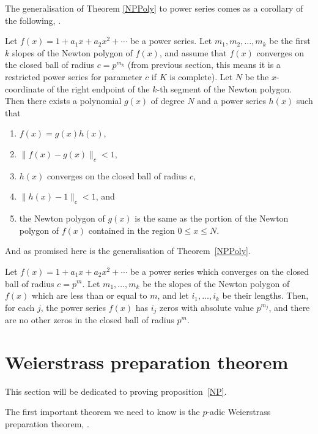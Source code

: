 The generalisation of Theorem \ref{NPPoly} to power series comes as a corollary of the following,
\cite[proposition~7.4.10]{Gouvea}.

\begin{proposition}\label{NP}
    Let $f(x) = 1 + a_1 x + a_2 x^2 + \cdots$ be a power series. Let $m_1,m_2, \dots,m_k$ be the
    first $k$ slopes of the Newton polygon of $f(x)$, and assume that $f(x)$ converges on the
    closed ball of radius $c = p^{m_k}$ (from previous section, this means it is a restricted power
    series for parameter $c$ if $K$ is complete). Let $N$ be the $x$-coordinate of the right
    endpoint of the $k$-th segment of the Newton polygon. Then there exists a polynomial
    $g(x)$ of degree $N$ and a power series $h(x)$ such that
    \begin{enumerate}
        \item $f(x) = g(x) h(x)$,
        \item $\| f(x) - g(x) \|_c < 1$,
        \item $h(x)$ converges on the closed ball of radius $c$,
        \item $\| h(x) - 1\|_c <1$, and
        \item the Newton polygon of $g(x)$ is the same as the portion of the Newton polygon of
        $f(x)$ contained in the region $0 \leq x \leq N$.
    \end{enumerate}
\end{proposition}

And as promised here is the generalisation of Theorem~\ref{NPPoly}.

\begin{corollary}
    Let $f(x) = 1 + a_1 x + a_2 x^2 + \cdots$ be a power series which converges on the closed ball
    of radius $c = p^m$. Let $m_1,\dots, m_k$ be the slopes of the Newton polygon of $f(x)$ which
    are less than or equal to $m$, and let $i_1,\dots,i_k$ be their lengths. Then, for each $j$, the
    power series $f(x)$ has $i_j$ zeros with absolute value $p^{m_j}$, and there are no other zeros
    in the closed ball of radius $p^m.$
\end{corollary}

\section{Weierstrass preparation theorem}

This section will be dedicated to proving proposition~\ref{NP}.

The first important theorem we need to know is the $p$-adic Weierstrass preparation theorem,
\cite[Theorem~7.2.10]{Gouvea}.

